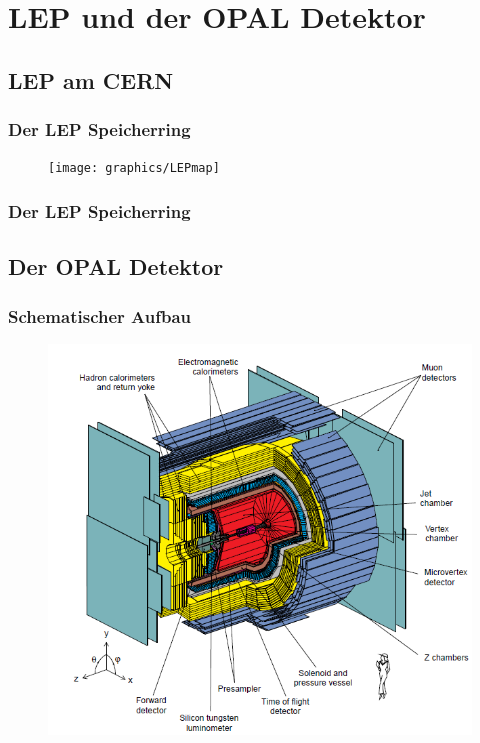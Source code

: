 \section{LEP und der OPAL Detektor}
\subsection{LEP am CERN}
\begin{frame}
	\frametitle{Der LEP Speicherring}
	\begin{figure}
		\texttt{[image: graphics/LEPmap]}
	\end{figure}
\end{frame}

\begin{frame}
	\frametitle{Der LEP Speicherring}
	
\end{frame}

\subsection{Der OPAL Detektor}
\begin{frame}
	\frametitle{Schematischer Aufbau}
	\begin{center}
	\begin{figure}
		\includegraphics[width=0.7\linewidth]{graphics/OPALaufbau}
	\end{figure}
	\end{center}
\end{frame}

